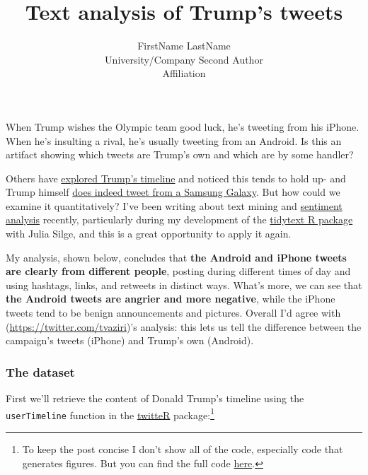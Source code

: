 \documentclass[
]{jss}
\author{
FirstName LastName\\University/Company \And Second Author\\Affiliation
}
\title{Text analysis of Trump's tweets \pkg{foo}}
\begin{document}
When Trump wishes the Olympic team good luck, he's tweeting from his
iPhone. When he's insulting a rival, he's usually tweeting from an
Android. Is this an artifact showing which tweets are Trump's own and
which are by some handler?

Others have
\href{http://www.cnet.com/news/trumps-tweets-android-for-nasty-iphone-for-nice/}{explored
Trump's timeline} and noticed this tends to hold up- and Trump himself
\href{http://www.theverge.com/2015/10/5/9453935/donald-trump-twitter-strategy}{does
indeed tweet from a Samsung Galaxy}. But how could we examine it
quantitatively? I've been writing about text mining and
\href{http://varianceexplained.org/r/yelp-sentiment/}{sentiment
analysis} recently, particularly during my development of the
\href{http://github.com/juliasilge/tidytext}{tidytext R package} with
Julia Silge, and this is a great opportunity to apply it again.

My analysis, shown below, concludes that \textbf{the Android and iPhone
tweets are clearly from different people}, posting during different
times of day and using hashtags, links, and retweets in distinct ways.
What's more, we can see that \textbf{the Android tweets are angrier and
more negative}, while the iPhone tweets tend to be benign announcements
and pictures. Overall I'd agree with
\citep{tvaziri}(\url{https://twitter.com/tvaziri})'s analysis: this lets
us tell the difference between the campaign's tweets (iPhone) and
Trump's own (Android).

\hypertarget{the-dataset}{%
\subsubsection{The dataset}\label{the-dataset}}

First we'll retrieve the content of Donald Trump's timeline using the
\texttt{userTimeline} function in the
\href{https://cran.r-project.org/web/packages/twitteR}{twitteR}
package:\footnote{To keep the post concise I don't show all of the code,
  especially code that generates figures. But you can find the full code
  \href{https://github.com/dgrtwo/dgrtwo.github.com/blob/master/_R/2016-08-09-trump-tweets.Rmd}{here}.}
\end{document}
